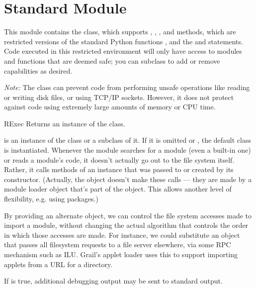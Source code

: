 \section{Standard Module }




This module contains the  class, which supports
, , , and
 methods, which are restricted versions of the standard
Python functions ,  and
the  and  statements.
Code executed in this restricted environment will
only have access to modules and functions that are deemed safe; you
can subclass  to add or remove capabilities as desired.

\emph{Note:} The  class can prevent code from performing
unsafe operations like reading or writing disk files, or using TCP/IP
sockets.  However, it does not protect against code using extremely
large amounts of memory or CPU time.  

\begin{classdesc}{RExec}{}
Returns an instance of the  class.  

 is an instance of the  class or a subclass of it.
If it is omitted or , the default  class is
instantiated.
Whenever the  module searches for a module (even a
built-in one) or reads a module's code, it doesn't actually go out to
the file system itself.  Rather, it calls methods of an 
instance that was passed to or created by its constructor.  (Actually,
the  object doesn't make these calls --- they are made by
a module loader object that's part of the  object.  This
allows another level of flexibility, e.g. using packages.)

By providing an alternate  object, we can control the
file system accesses made to import a module, without changing the
actual algorithm that controls the order in which those accesses are
made.  For instance, we could substitute an  object that
passes all filesystem requests to a file server elsewhere, via some
RPC mechanism such as ILU.  Grail's applet loader uses this to support
importing applets from a URL for a directory.

If  is true, additional debugging output may be sent to
standard output.
\end{classdesc}

